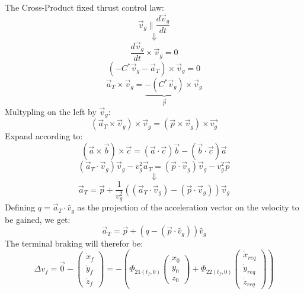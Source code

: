 \documentclass[11pt, a4paper]{article}
\begin{document}
\vspace{1cm}
The Cross-Product fixed thrust control law:
\begin{equation}
    \vec{v}_g\parallel\frac{d\vec{v}_g}{dt}
\end{equation}
\begin{equation*}
    \Downarrow
\end{equation*}
\begin{equation*}
    \frac{d\vec{v}_g}{dt}\times\vec{v}_g=0
\end{equation*}
\begin{equation}
    \left(-C^*\vec{v}_g-\vec{a}_T\right)\times\vec{v}_g=0
\end{equation}
\begin{equation}
    \vec{a}_T\times\vec{v}_g=\underbrace{-\left(C^*\vec{v}_g\right)}_{\vec{p}}\times\vec{v}_g
\end{equation}
Multypling on the left by $\vec{v}_g$:
\begin{equation}
    \left(\vec{a}_T\times\vec{v}_g\right)\times\vec{v}_g = \left(\vec{p}\times\vec{v}_g\right)\times\vec{v_g}
\end{equation}
Expand according to:
\begin{equation*}
    \left(\vec{a}\times\vec{b}\right)\times\vec{c} = \left(\vec{a}\cdot \vec{c}\right)\vec{b} - \left(\vec{b}\cdot\vec{c}\right)\vec{a}
\end{equation*}
\begin{equation}
    \left(\vec{a}_T\cdot\vec{v}_g\right)\vec{v}_g - v_g^2\vec{a}_T = \left(\vec{p}\cdot\vec{v}_g\right)\vec{v}_g - v_g^2\vec{p}
\end{equation}
\begin{equation*}
    \Downarrow
\end{equation*}
\begin{equation}
    \vec{a}_T=\vec{p}+\frac{1}{v_g^2}\left(\left(\vec{a}_T\cdot\vec{v}_g\right)-\left(\vec{p}\cdot\vec{v}_g\right)\right)\vec{v}_g
\end{equation}
Defining $q=\vec{a}_T\cdot\hat{v}_g$ as the projection of the acceleration vector on the velocity to be gained, we get:
\begin{equation}
    \vec{a}_T=\vec{p}+\left(q-\left(\vec{p}\cdot\hat{v}_g\right)\right)\hat{v}_g
\end{equation}
The terminal braking will therefor be:
\begin{equation}
    \Delta v_f = \vec{0} - \begin{pmatrix}
        \dot{x}_{f}\\\dot{y}_{f}\\\dot{z}_{f}
    \end{pmatrix} = -\left(\Phi_{21(t_f,0)}\begin{pmatrix}
        x_0\\y_0\\z_0
    \end{pmatrix} + \Phi_{22(t_f,0)}\begin{pmatrix}
        \dot{x}_{req}\\\dot{y}_{req}\\\dot{z}_{req}
    \end{pmatrix}\right)
\end{equation}
\end{document}
